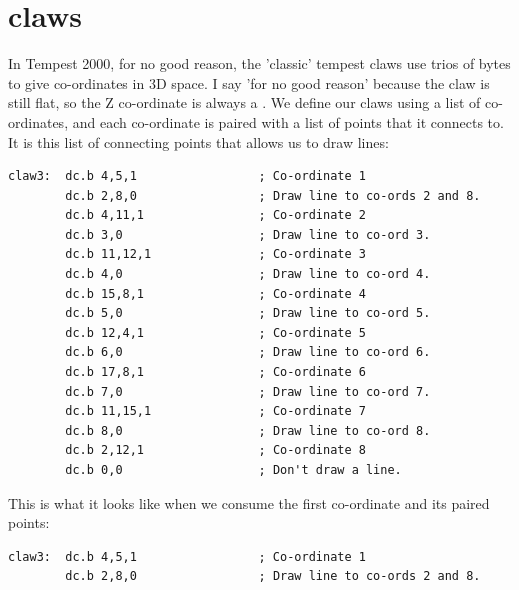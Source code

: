 \chapter{claws}
\label{sec:claws}
\lhead[tempest 2000]{}
\lstset{style=68KStyle}

In Tempest 2000, for no good reason, the 'classic' tempest claws use trios of bytes to give
co-ordinates in 3D space. I say 'for no good reason' because the claw is still flat, so the
Z co-ordinate is always a . We define our claws using a list of  
co-ordinates, and each co-ordinate is paired with a list of points that it connects to. It
is this list of connecting points that allows us to draw lines:
\begin{lstlisting}
claw3:  dc.b 4,5,1                 ; Co-ordinate 1
        dc.b 2,8,0                 ; Draw line to co-ords 2 and 8.
        dc.b 4,11,1                ; Co-ordinate 2
        dc.b 3,0                   ; Draw line to co-ord 3.
        dc.b 11,12,1               ; Co-ordinate 3
        dc.b 4,0                   ; Draw line to co-ord 4.
        dc.b 15,8,1                ; Co-ordinate 4
        dc.b 5,0                   ; Draw line to co-ord 5.
        dc.b 12,4,1                ; Co-ordinate 5
        dc.b 6,0                   ; Draw line to co-ord 6.
        dc.b 17,8,1                ; Co-ordinate 6
        dc.b 7,0                   ; Draw line to co-ord 7.
        dc.b 11,15,1               ; Co-ordinate 7
        dc.b 8,0                   ; Draw line to co-ord 8.
        dc.b 2,12,1                ; Co-ordinate 8
        dc.b 0,0                   ; Don't draw a line.
\end{lstlisting}

This is what it looks like when we consume the first co-ordinate and its paired points:
\begin{lstlisting}
claw3:  dc.b 4,5,1                 ; Co-ordinate 1
        dc.b 2,8,0                 ; Draw line to co-ords 2 and 8.
\end{lstlisting}

